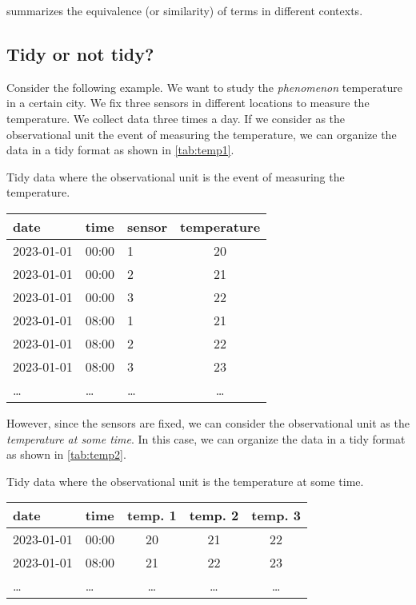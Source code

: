  summarizes the equivalence (or similarity) of terms in different
contexts.

\subsection{Tidy or not tidy?}
\label{sub:tidy-not-tidy}

Consider the following example.  We want to study the \emph{phenomenon} temperature in a
certain city.  We fix three sensors in different locations to measure the temperature.  We
collect data three times a day.  If we consider as the observational unit the
event of measuring the temperature, we can organize the data in a tidy format as shown in
\cref{tab:temp1}.

\begin{tablebox}[label=tab:temp1]{Tidy data where the observational unit is the event of measuring the temperature.}
  \centering
  \begin{tabular}{lllc}
    \toprule
    \textbf{date} & \textbf{time} & \textbf{sensor} & \textbf{temperature} \\
    \midrule
    2023-01-01 & 00:00 & 1 & 20 \\
    2023-01-01 & 00:00 & 2 & 21 \\
    2023-01-01 & 00:00 & 3 & 22 \\
    2023-01-01 & 08:00 & 1 & 21 \\
    2023-01-01 & 08:00 & 2 & 22 \\
    2023-01-01 & 08:00 & 3 & 23 \\
    \dots & \dots & \dots & \dots \\
    \bottomrule
  \end{tabular}
\end{tablebox}

However, since the sensors are fixed, we can consider the observational unit as the
\emph{temperature at some time}.  In this case, we can organize the data in a tidy format
as shown in \cref{tab:temp2}.

\begin{tablebox}[label=tab:temp2]{Tidy data where the observational unit is the temperature at some time.}
  \centering
  \begin{tabular}{llccc}
    \toprule
    \textbf{date} & \textbf{time} & \textbf{temp. 1} & \textbf{temp. 2} & \textbf{temp. 3} \\
    \midrule
    2023-01-01 & 00:00 & 20 & 21 & 22 \\
    2023-01-01 & 08:00 & 21 & 22 & 23 \\
    \dots & \dots & \dots & \dots & \dots \\
    \bottomrule
  \end{tabular}
\end{tablebox}

